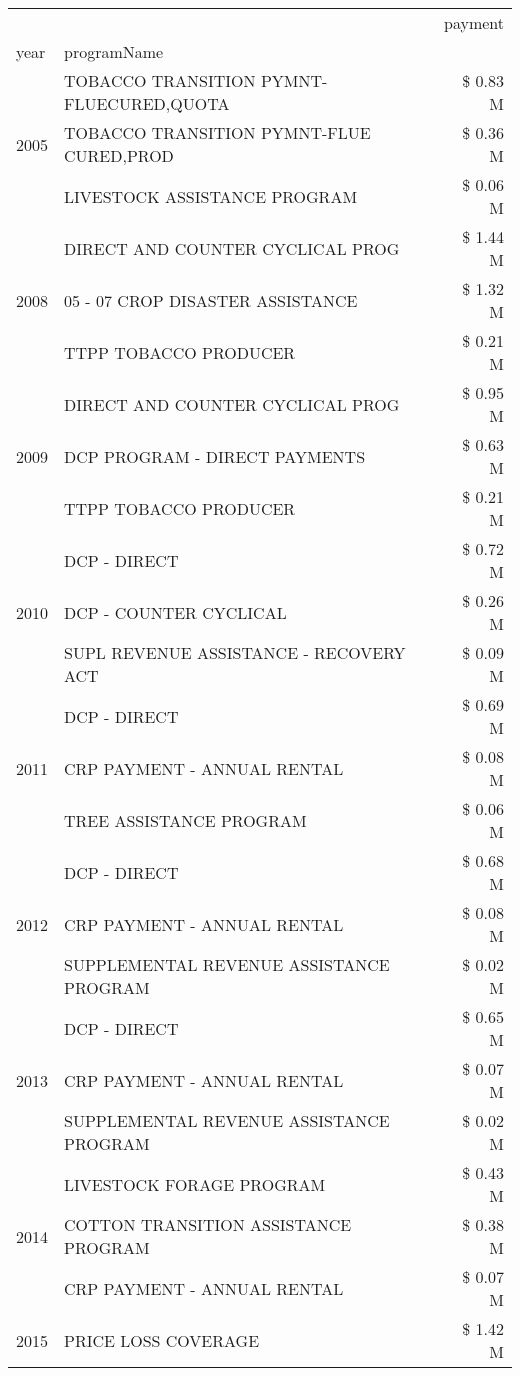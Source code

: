 \begin{tabular}{llr}
\toprule
 &  & payment \\
year & programName &  \\
\midrule
\multirow[t]{3}{*}{2005} & TOBACCO TRANSITION PYMNT-FLUECURED,QUOTA & \$ 0.83 M \\
 & TOBACCO TRANSITION PYMNT-FLUE CURED,PROD & \$ 0.36 M \\
 & LIVESTOCK ASSISTANCE PROGRAM & \$ 0.06 M \\
\cline{1-3}
\multirow[t]{3}{*}{2008} & DIRECT AND COUNTER CYCLICAL PROG & \$ 1.44 M \\
 & 05 - 07 CROP DISASTER ASSISTANCE & \$ 1.32 M \\
 & TTPP TOBACCO PRODUCER & \$ 0.21 M \\
\cline{1-3}
\multirow[t]{3}{*}{2009} & DIRECT AND COUNTER CYCLICAL PROG & \$ 0.95 M \\
 & DCP PROGRAM - DIRECT PAYMENTS & \$ 0.63 M \\
 & TTPP TOBACCO PRODUCER & \$ 0.21 M \\
\cline{1-3}
\multirow[t]{3}{*}{2010} & DCP - DIRECT & \$ 0.72 M \\
 & DCP - COUNTER CYCLICAL & \$ 0.26 M \\
 & SUPL REVENUE ASSISTANCE - RECOVERY ACT & \$ 0.09 M \\
\cline{1-3}
\multirow[t]{3}{*}{2011} & DCP - DIRECT & \$ 0.69 M \\
 & CRP PAYMENT - ANNUAL RENTAL & \$ 0.08 M \\
 & TREE ASSISTANCE PROGRAM & \$ 0.06 M \\
\cline{1-3}
\multirow[t]{3}{*}{2012} & DCP - DIRECT & \$ 0.68 M \\
 & CRP PAYMENT - ANNUAL RENTAL & \$ 0.08 M \\
 & SUPPLEMENTAL REVENUE ASSISTANCE PROGRAM & \$ 0.02 M \\
\cline{1-3}
\multirow[t]{3}{*}{2013} & DCP - DIRECT & \$ 0.65 M \\
 & CRP PAYMENT - ANNUAL RENTAL & \$ 0.07 M \\
 & SUPPLEMENTAL REVENUE ASSISTANCE PROGRAM & \$ 0.02 M \\
\cline{1-3}
\multirow[t]{3}{*}{2014} & LIVESTOCK FORAGE PROGRAM & \$ 0.43 M \\
 & COTTON TRANSITION ASSISTANCE PROGRAM & \$ 0.38 M \\
 & CRP PAYMENT - ANNUAL RENTAL & \$ 0.07 M \\
\cline{1-3}
\multirow[t]{3}{*}{2015} & PRICE LOSS COVERAGE & \$ 1.42 M \\

\end{tabular}
